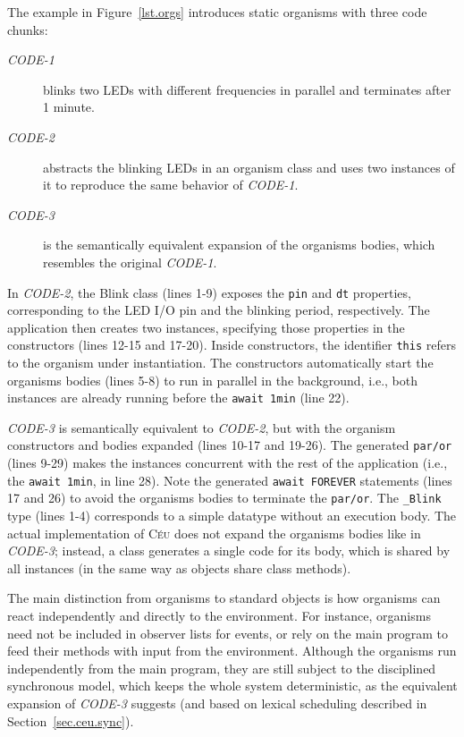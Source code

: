 \documentclass{sigplanconf}
\newcommand{\CEU}{\textsc{C\'{e}u}\xspace}
\newcommand{\code}[1] {{\small{\texttt{#1}}}}
\newcommand{\1}{\;}
\newcommand{\2}{\;\;}
\newcommand{\3}{\;\;\;}
\newcommand{\5}{\;\;\;\;\;}
\begin{document}
The example in Figure~\ref{lst.orgs} introduces static organisms with three 
code chunks:
%
\begin{description}
\item[\emph{CODE-1}] blinks two LEDs with different frequencies in parallel and 
terminates after 1 minute.
%
\item[\emph{CODE-2}] abstracts the blinking LEDs in an organism class and uses 
two instances of it to reproduce the same behavior of \emph{CODE-1}.
%
\item[\emph{CODE-3}] is the semantically equivalent expansion of the organisms 
bodies, which resembles the original \emph{CODE-1}.
\end{description}
%
In \emph{CODE-2}, the Blink class (lines 1-9) exposes the \code{pin} and 
\code{dt} properties, corresponding to the LED I/O pin and the blinking period, 
respectively.
The application then creates two instances, specifying those properties in the 
constructors (lines 12-15 and 17-20).
Inside constructors, the identifier \code{this} refers to the organism under 
instantiation.
The constructors automatically start the organisms bodies (lines 5-8) to run in 
parallel in the background, i.e., both instances are already running before the 
\code{await 1min} (line 22).

\emph{CODE-3} is semantically equivalent to \emph{CODE-2}, but with the 
organism constructors and bodies expanded (lines 10-17 and 19-26).
The generated \code{par/or} (lines 9-29) makes the instances concurrent with 
the rest of the application (i.e., the \code{await 1min}, in line 28).
Note the generated \code{await FOREVER} statements (lines 17 and 26) to avoid 
the organisms bodies to terminate the \code{par/or}.
The \code{\_Blink} type (lines 1-4) corresponds to a simple datatype without an
execution body.
%
The actual implementation of \CEU does not expand the organisms bodies like in 
\emph{CODE-3}; instead, a class generates a single code for its body, which is 
shared by all instances (in the same way as objects share class methods).

The main distinction from organisms to standard objects is how organisms can 
react independently and directly to the environment.
%
For instance, organisms need not be included in observer lists for events, or 
rely on the main program to feed their methods with input from the environment.
%
Although the organisms run independently from the main program, they are still 
subject to the disciplined synchronous model, which keeps the whole system 
deterministic, as the equivalent expansion of \emph{CODE-3} suggests (and based 
on lexical scheduling described in Section~\ref{sec.ceu.sync}).
%
\end{document}
